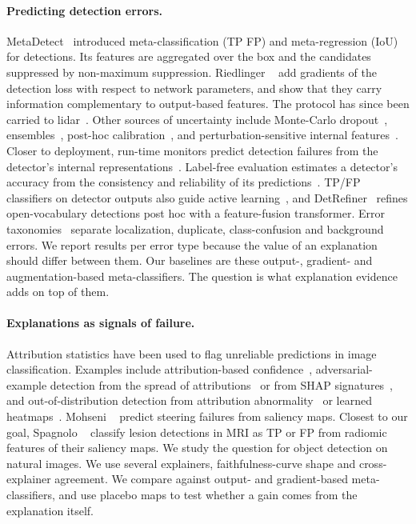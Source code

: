 \paragraph{Predicting detection errors.}
MetaDetect~\cite{schubert2021metadetect} introduced meta-classification
(TP \vs FP) and meta-regression (IoU) for detections. Its features are
aggregated over the box and the candidates suppressed by non-maximum
suppression. Riedlinger \etal~\cite{riedlinger2023gradient} add gradients of
the detection loss with respect to network parameters, and show that they
carry information complementary to output-based features. The protocol has
since been carried to lidar~\cite{riedlinger2025lmd}.
Other sources of uncertainty include Monte-Carlo
dropout~\cite{miller2018dropout}, ensembles~\cite{lakshminarayanan2017ensembles},
post-hoc calibration~\cite{kuzucu2024calibration,oksuz2023saod}, and
perturbation-sensitive internal features~\cite{wilson2023safe}.
Closer to deployment, run-time monitors predict detection failures from the
detector's internal representations~\cite{yatbaz2024introspection}.
Label-free evaluation estimates a detector's accuracy from the consistency
and reliability of its predictions~\cite{pcr2025}. TP/FP classifiers on
detector outputs also guide active learning~\cite{sharma2026portable}, and
DetRefiner~\cite{okazaki2026detrefiner} refines open-vocabulary detections
post hoc with a feature-fusion transformer.
Error taxonomies~\cite{hoiem2012diagnosing,bolya2020tide} separate
localization, duplicate, class-confusion and background errors. We report
results per error type because the value of an explanation should differ
between them.
Our baselines are these output-, gradient- and augmentation-based
meta-classifiers. The question is what explanation evidence adds on top of
them.

\paragraph{Explanations as signals of failure.}
Attribution statistics have been used to flag unreliable predictions in image
classification. Examples include attribution-based
confidence~\cite{jha2019abc}, adversarial-example detection from the spread
of attributions~\cite{yang2020mlloo} or from SHAP
signatures~\cite{fidel2020shap}, and out-of-distribution detection from
attribution abnormality~\cite{chen2023gaia} or learned
heatmaps~\cite{hornauer2023heatmap}. Mohseni \etal~\cite{mohseni2019predicting}
predict steering failures from saliency maps. Closest to our goal,
Spagnolo \etal~\cite{spagnolo2024xaimaps} classify lesion detections in MRI as
TP or FP from radiomic features of their saliency maps.
We study the question for object detection on natural images. We use several
explainers, faithfulness-curve shape and cross-explainer agreement. We
compare against output- and gradient-based meta-classifiers, and use placebo
maps to test whether a gain comes from the explanation itself.

